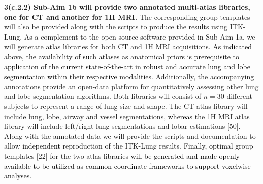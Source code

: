 \documentclass[11pt,]{article}
\begin{document}
\textbf{3(c.2.2) Sub-Aim 1b will provide two annotated multi-atlas
libraries, one for CT and another for 1H MRI.} The corresponding group
templates will also be provided along with the scripts to produce the
results using ITK-Lung. As a complement to the open-source software
provided in Sub-Aim 1a, we will generate atlas libraries for both CT and
1H MRI acquisitions.
\textcolor{black}{As indicated above, the availability of such atlases as anatomical priors
is prerequisite to application of the current state-of-the-art in robust and accurate lung
and lobe segmentation within their respective modalities.} Additionally,
the accompanying annotations provide an open-data platform for
quantitatively assessing other lung and lobe segmentation algorithms.
Both libraries will consist of \(n=30\) different subjects to represent
a range of lung size and shape. The CT atlas library will include lung,
lobe, airway and vessel segmentations, \textcolor{black}{whereas t}he 1H
MRI atlas library will include left/right lung segmentations and lobar
estimations {[}50{]}. Along with the annotated data we will provide the
scripts and documentation to allow \textcolor{black}{independent}
reproduction of the ITK-Lung results.
\textcolor{black}{Finally, optimal} group templates {[}22{]} for the two
atlas libraries
\textcolor{black}{will be generated and made openly available to be utilized as common coordinate
frameworks to support voxelwise analyses.}
\end{document}
